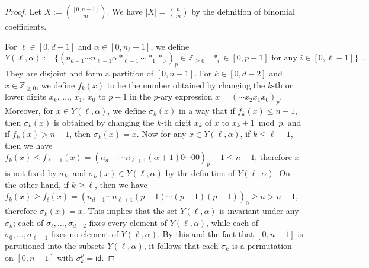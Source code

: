 ﻿\documentclass{article}
\theoremstyle{definition}
\begin{document}
\begin{proof}
    Let $X := \binom{[0,n-1]}{m}$.
    We have $|X| = \binom{n}{m}$ by the definition of binomial coefficients.

    For $\ell \in [0,d-1]$ and $\alpha \in [0,n_{\ell}-1]$, we define
    \[
        Y(\ell, \alpha) := \{ (n_{d-1} \cdots n_{\ell+1} \alpha *_{\ell-1} \cdots *_1 *_0)_p \in \mathbb{Z}_{\geq 0} \mid \mbox{$*_i \in [0,p-1]$ for any $i \in [0,\ell-1]$} \} \enspace.
    \]
    They are disjoint and form a partition of $[0,n-1]$.
    For $k \in [0,d-2]$ and $x \in \mathbb{Z}_{\geq 0}$, we define $f_k(x)$ to be the number obtained by changing the $k$-th or lower digits $x_k$, $\dots$, $x_1$, $x_0$ to $p-1$ in the $p$-ary expression $x = (\cdots x_2 x_1 x_0)_p$.
    Moreover, for $x \in Y(\ell,\alpha)$, we define $\sigma_k(x)$ in a way that if $f_k(x) \leq n-1$, then $\sigma_k(x)$ is obtained by changing the $k$-th digit $x_k$ of $x$ to $x_k + 1 \bmod p$, and if $f_k(x) > n-1$, then $\sigma_k(x) = x$.
    Now for any $x \in Y(\ell,\alpha)$, if $k \leq \ell-1$, then we have $f_k(x) \leq f_{\ell-1}(x) = (n_{d-1} \cdots n_{\ell+1} (\alpha+1) 0 \cdots 00)_p - 1 \leq n-1$, therefore $x$ is not fixed by $\sigma_k$, and $\sigma_k(x) \in Y(\ell,\alpha)$ by the definition of $Y(\ell,\alpha)$.
    On the other hand, if $k \geq \ell$, then we have $f_k(x) \geq f_{\ell}(x) = (n_{d-1} \cdots n_{\ell+1} (p-1) \cdots (p-1)(p-1))_0 \geq n > n-1$, therefore $\sigma_k(x) = x$.
    This implies that the set $Y(\ell,\alpha)$ is invariant under any $\sigma_k$; each of $\sigma_{\ell},\dots,\sigma_{d-2}$ fixes every element of $Y(\ell,\alpha)$, while each of $\sigma_0,\dots,\sigma_{\ell-1}$ fixes no element of $Y(\ell,\alpha)$.
    By this and the fact that $[0,n-1]$ is partitioned into the subsets $Y(\ell,\alpha)$, it follows that each $\sigma_k$ is a permutation on $[0,n-1]$ with $\sigma_k^p = \mathsf{id}$.


\end{proof}
\end{document}
